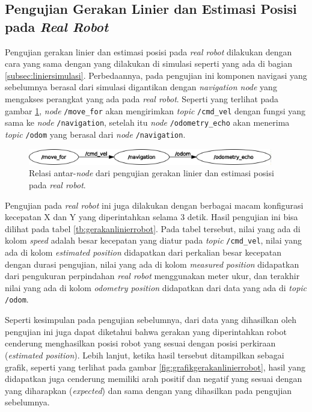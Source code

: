 \subsection{Pengujian Gerakan Linier dan Estimasi Posisi pada \emph{Real Robot}}
\label{subsec:linierrobot}

Pengujian gerakan linier dan estimasi posisi pada \emph{real robot} dilakukan dengan cara yang sama dengan yang dilakukan di simulasi seperti yang ada di bagian \ref{subsec:liniersimulasi}.
Perbedaannya, pada pengujian ini komponen navigasi yang sebelumnya berasal dari simulasi digantikan dengan \emph{navigation node} yang mengakses perangkat yang ada pada \emph{real robot}.
Seperti yang terlihat pada gambar \ref{fig:rosgraphnavigation},
  \emph{node} \lstinline{/move_for} akan mengirimkan \emph{topic} \lstinline{/cmd_vel} dengan fungsi yang sama ke \emph{node} \lstinline{/navigation},
  setelah itu \emph{node} \lstinline{/odometry_echo} akan menerima \emph{topic} \lstinline{/odom} yang berasal dari \emph{node} \lstinline{/navigation}.

\begin{figure}[ht]
  \centering
  \includegraphics[width=0.95\textwidth,keepaspectratio]{gambar/rosgraph-navigation.png}
  \caption{Relasi antar-\emph{node} dari pengujian gerakan linier dan estimasi posisi pada \emph{real robot}.}
  \label{fig:rosgraphnavigation}
\end{figure}

Pengujian pada \emph{real robot} ini juga dilakukan dengan berbagai macam konfigurasi kecepatan X dan Y yang diperintahkan selama 3 detik.
Hasil pengujian ini bisa dilihat pada tabel \ref{tb:gerakanlinierrobot}.
Pada tabel tersebut, nilai yang ada di kolom \emph{speed} adalah besar kecepatan yang diatur pada \emph{topic} \lstinline{/cmd_vel},
  nilai yang ada di kolom \emph{estimated position} didapatkan dari perkalian besar kecepatan dengan durasi pengujian,
  nilai yang ada di kolom \emph{measured position} didapatkan dari pengukuran perpindahan \emph{real robot} menggunakan meter ukur,
  dan terakhir nilai yang ada di kolom \emph{odometry position} didapatkan dari data yang ada di \emph{topic} \lstinline{/odom}.



Seperti kesimpulan pada pengujian sebelumnya,
  dari data yang dihasilkan oleh pengujian ini juga dapat diketahui bahwa gerakan yang diperintahkan robot cenderung menghasilkan posisi robot yang sesuai dengan posisi perkiraan (\emph{estimated position}).
Lebih lanjut, ketika hasil tersebut ditampilkan sebagai grafik,
  seperti yang terlihat pada gambar \ref{fig:grafikgerakanlinierrobot},
  hasil yang didapatkan juga cenderung memiliki arah positif dan negatif yang sesuai dengan yang diharapkan (\emph{expected}) dan sama dengan yang dihasilkan pada pengujian sebelumnya.


